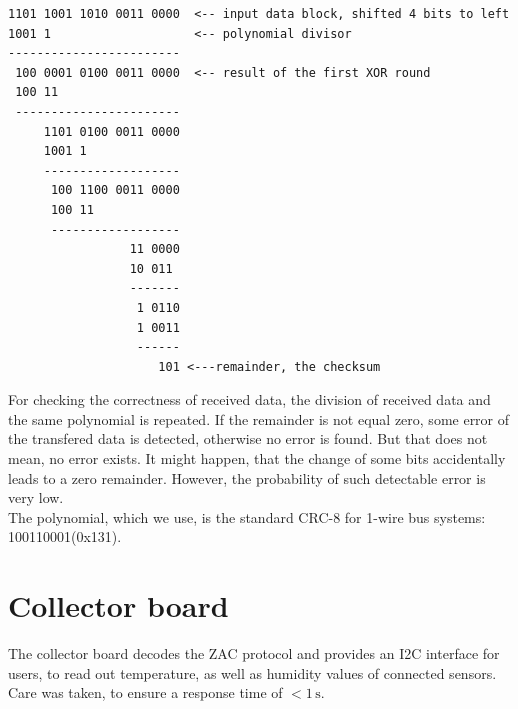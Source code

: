 \documentclass[a4paper]{scrreprt}
\begin{document}
\lstset{style=mathstyle}
\begin{lstlisting}[xleftmargin=25pt, xrightmargin=25pt,framexleftmargin=10pt,framextopmargin=10pt, framexbottommargin=10pt]
1101 1001 1010 0011 0000  <-- input data block, shifted 4 bits to left 
1001 1                    <-- polynomial divisor
------------------------
 100 0001 0100 0011 0000  <-- result of the first XOR round
 100 11
 -----------------------
     1101 0100 0011 0000
     1001 1
     -------------------
      100 1100 0011 0000
      100 11
      ------------------
                 11 0000
                 10 011
                 -------
                  1 0110
                  1 0011
                  ------
                     101 <---remainder, the checksum
\end{lstlisting}
For checking the correctness of received data, the division of received data and the same polynomial is repeated.
If the remainder is not equal zero, some error of the transfered data is detected, otherwise no error is found.
But that does not mean, no error exists.
It might happen, that the change of some bits accidentally leads to a zero remainder. However, the probability of such detectable error is very low.\\
The polynomial, which we use, is the standard CRC-8 for 1-wire bus systems: 100110001(0x131).
\section{Collector board}
The collector board decodes the ZAC protocol and provides an I2C interface
for users, to read out temperature, as well as humidity values of connected sensors.
Care was taken, to ensure a response time of $<1\,\mathrm{s}$.
\end{document}
